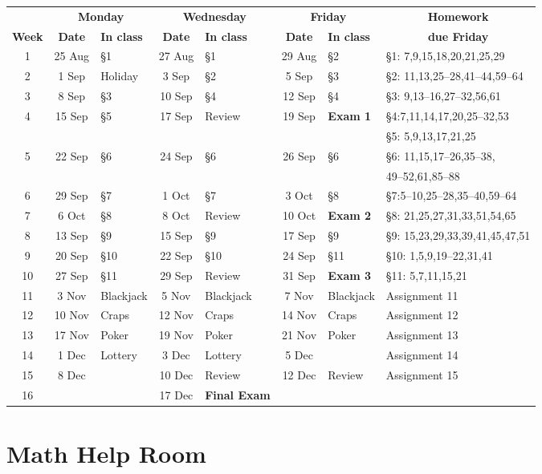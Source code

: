 \documentclass[11pt]{article}
\begin{document}
\begin{tabular}{c|cl|cl|cl|l}
&\multicolumn{2}{c|}{\bf Monday}
&\multicolumn{2}{c|}{\bf Wednesday}
&\multicolumn{2}{c}{\bf Friday}&\multicolumn{1}{c}{\bf Homework}\\
{\bf Week}&{\bf Date}&{\bf In class}
&{\bf Date}&{\bf In class}&{\bf Date}&{\bf In class}&\multicolumn{1}{c}{\bf due Friday}\\\toprule
1&25 Aug&\S1&27 Aug&\S1&29 Aug&\S2&\S1: 7,9,15,18,20,21,25,29\\\midrule
2&1 Sep&Holiday&3 Sep&\S2&5 Sep&\S3&\S2: 11,13,25--28,41--44,59--64\\\midrule
3&8 Sep&\S3&10 Sep&\S4&12 Sep&\S4&\S3: 9,13--16,27--32,56,61\\\midrule
4&15 Sep&\S5&17 Sep&Review&19 Sep&{\bf Exam 1}&\S4:7,11,14,17,20,25--32,53\\
&&&&&&&\S5: 5,9,13,17,21,25\\\midrule
5&22 Sep&\S6&24 Sep&\S6&26 Sep&\S6&\S6: 11,15,17--26,35--38,\\
&&&&&&&49--52,61,85--88\\\midrule
6&29 Sep&\S7&1 Oct&\S7&3 Oct&\S8&\S7:5--10,25--28,35--40,59--64\\\midrule
7&6 Oct&\S8&8 Oct&Review&10 Oct&{\bf Exam 2}&\S8: 21,25,27,31,33,51,54,65\\\midrule
8&13 Sep&\S9&15 Sep&\S9&17 Sep&\S9&\S9: 15,23,29,33,39,41,45,47,51\\\midrule
9&20 Sep&\S10&22 Sep&\S10&24 Sep&\S11&\S10: 1,5,9,19--22,31,41\\\midrule
10&27 Sep&\S11&29 Sep&Review&31 Sep&{\bf Exam 3}&\S11: 5,7,11,15,21\\\midrule
11&3 Nov&Blackjack&5 Nov&Blackjack&7 Nov&Blackjack&Assignment 11\\\midrule
12&10 Nov&Craps&12 Nov&Craps&14 Nov&Craps&Assignment 12\\\midrule
13&17 Nov&Poker&19 Nov&Poker&21 Nov&Poker&Assignment 13\\\midrule
14&1 Dec&Lottery&3 Dec&Lottery&5 Dec&&Assignment 14\\\midrule
15&8 Dec&&10 Dec&Review&12 Dec&Review&Assignment 15\\\midrule
16&&&17 Dec&{\bf Final Exam}&&
\end{tabular}

\section{Math Help Room}\label{MathCenter}
\end{document}
